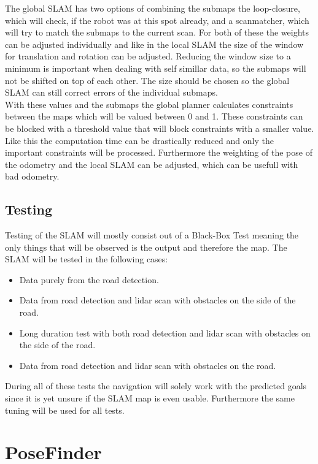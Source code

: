 The global SLAM has two options of combining the submaps the loop-closure, which will check, if the robot was at this spot already, and a scanmatcher, which will try to match the submaps to the current scan. For both of these the weights can be adjusted individually and like in the local SLAM the size of the window for translation and rotation can be adjusted. Reducing the window size to a minimum is important when dealing with self simillar data, so the submaps will not be shifted on top of each other. The size should be chosen so the global SLAM can still correct errors of the individual submaps.\\
With these values and the submaps the global planner calculates constraints between the maps which will be valued between 0 and 1. These constraints can be blocked with a threshold value that will block constraints with a smaller value. Like this the computation time can be drastically reduced and only the important constraints will be processed. Furthermore the weighting of the pose of the odometry and the local SLAM can be adjusted, which can be usefull with bad odometry.

\subsection{Testing}
Testing of the SLAM will mostly consist out of a Black-Box Test meaning the only things that will be observed is the output and therefore the map.
The SLAM will be tested in the following cases:
\begin{itemize}
	\item Data purely from the road detection.
	\item Data from road detection and lidar scan with obstacles on the side of the road.
	\item Long duration test with both road detection and lidar scan with obstacles on the side of the road.
	\item Data from road detection and lidar scan with obstacles on the road.
\end{itemize}

During all of these tests the navigation will solely work with the predicted goals since it is yet unsure if the SLAM map is even usable. Furthermore the same tuning will be used for all tests.\\



\section{PoseFinder}

